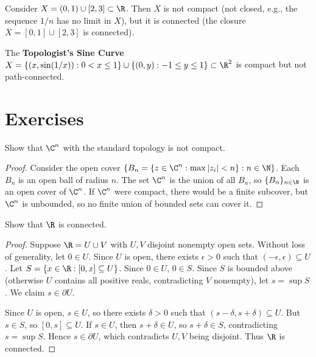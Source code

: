 \begin{example}
\label{ex:connected-not-compact}
Consider $X = (0, 1) \cup [2, 3] \subset \R$. Then $X$ is not compact (not closed, e.g., the sequence $1/n$ has no limit in $X$), but it is connected (the closure $\overline{X} = [0, 1] \cup [2, 3]$ is connected).

\end{example}

\begin{example}
\label{ex:compact-not-path-connected}
The \textbf{Topologist's Sine Curve} $X = \{(x, \sin(1/x)) : 0 < x \leq 1\} \cup \{(0, y) : -1 \leq y \leq 1\} \subset \R^2$ is compact but not path-connected.

\end{example}

\section{Exercises}
\label{sec:topology-exercises}

\begin{exercise}
\label{ex:compact-closed-bounded}
Show that $\C^n$ with the standard topology is not compact.

\begin{proof}
Consider the open cover $\{B_n = \{z \in \C^n : \max |z_i| < n\} : n \in \N\}$. Each $B_n$ is an open ball of radius $n$. The set $\C^n$ is the union of all $B_n$, so $\{B_n\}_{n \in \N}$ is an open cover of $\C^n$. If $\C^n$ were compact, there would be a finite subcover, but $\C^n$ is unbounded, so no finite union of bounded sets can cover it.
\end{proof}
\end{exercise}

\begin{exercise}
\label{ex:connected-real-line}
Show that $\R$ is connected.

\begin{proof}
Suppose $\R = U \cup V$ with $U, V$ disjoint nonempty open sets. Without loss of generality, let $0 \in U$. Since $U$ is open, there exists $\epsilon > 0$ such that $(-\epsilon, \epsilon) \subseteq U$. Let $S = \{x \in \R : [0, x] \subseteq U\}$. Since $0 \in U$, $0 \in S$. Since $S$ is bounded above (otherwise $U$ contains all positive reals, contradicting $V$ nonempty), let $s = \sup S$. We claim $s \in \partial U$.

Since $U$ is open, $s \in U$, so there exists $\delta > 0$ such that $(s-\delta, s+\delta) \subseteq U$. But $s \in S$, so $[0, s] \subseteq U$. If $s \in U$, then $s + \delta \in U$, so $s + \delta \in S$, contradicting $s = \sup S$. Hence $s \in \partial U$, which contradicts $U, V$ being disjoint. Thus $\R$ is connected.
\end{proof}
\end{exercise}

